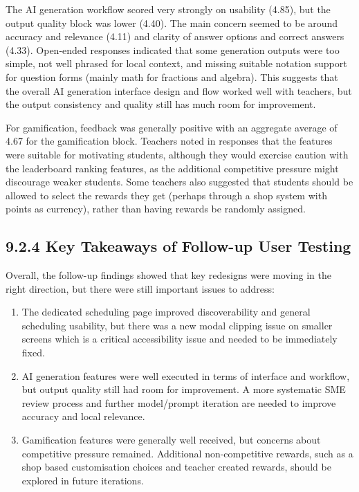 \documentclass[
  12pt,
  a4paper,
]{report}
\begin{document}
The AI generation workflow scored very strongly on usability (4.85),
but the output quality block was lower (4.40). The main concern
seemed to be around accuracy and relevance (4.11) and clarity
of answer options and correct answers (4.33). Open-ended responses
indicated that some generation outputs were too simple, not well phrased
for local context, and missing suitable notation support for question forms
(mainly math for fractions and algebra). This suggests that the overall AI generation
interface design and flow worked well with teachers, but the
output consistency and quality still has much room for improvement.

For gamification, feedback was generally positive with an aggregate average of 4.67
for the gamification block. Teachers noted in responses that the features were suitable
for motivating students, although they would exercise caution with the leaderboard ranking
features, as the additional competitive pressure might discourage weaker students. Some teachers
also suggested that students should be allowed to select the rewards they get (perhaps through
a shop system with points as currency), rather than having rewards be randomly assigned.

\hypertarget{key-takeaways-follow-up-user-testing}{%
\subsection{9.2.4 Key Takeaways of Follow-up User Testing}\label{key-takeaways-follow-up-user-testing}}

Overall, the follow-up findings showed that key redesigns were moving in
the right direction, but there were still important issues to address:

\begin{enumerate}
\def\labelenumi{\arabic{enumi}.}
\item
  The dedicated scheduling page improved discoverability and general
  scheduling usability, but there was a new modal clipping issue on smaller screens which is
  a critical accessibility issue and needed to be immediately fixed.
\item
  AI generation features were well executed in terms of interface and
  workflow, but output quality still had room for improvement. A more
  systematic SME review process and further model/prompt iteration are
  needed to improve accuracy and local relevance.
\item
  Gamification features were generally well received, but concerns about
  competitive pressure remained. Additional non-competitive rewards, such
  as a shop based customisation choices and teacher created rewards, should
  be explored in future iterations.
\end{enumerate}
\end{document}
